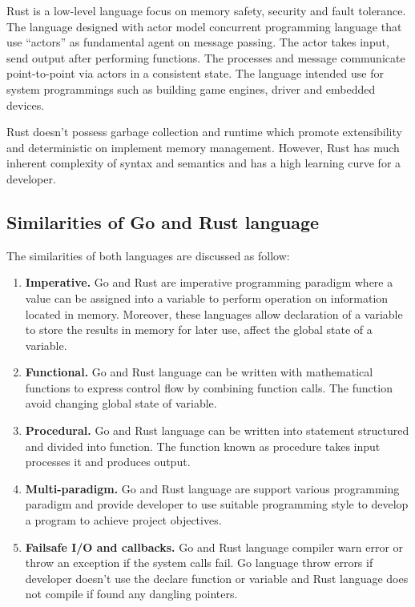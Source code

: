 \pagebreak

Rust is a low-level language focus on memory safety, security and fault tolerance. The language designed with actor model concurrent programming language that use “actors” as fundamental agent on message passing. The actor takes input, send output after performing functions. \cite{rust-actor-model} The processes and message communicate point-to-point via actors in a consistent state. The language intended use for system programmings such as building game engines, driver and embedded devices.

Rust doesn’t possess garbage collection and runtime which promote extensibility and deterministic on implement memory management. \cite{why-use-rust} However, Rust has much inherent complexity of syntax and semantics and has a high learning curve for a developer.
\pagebreak

\subsection{Similarities of Go and Rust language}

The similarities of both languages are discussed as follow: 

\begin{enumerate}[topsep=0pt,itemsep=-1ex,partopsep=1ex,parsep=1.5ex]
	
	\item \textbf{Imperative.} Go and Rust are imperative programming paradigm where a value can be assigned into a variable to perform operation on information located in memory. Moreover, these languages allow declaration of a variable to store the results in memory for later use, affect the global state of a variable.
	\item \textbf{Functional.} Go and Rust language can be written with mathematical functions to express control flow by combining function calls. The function avoid changing global state of variable. 
	\item \textbf{Procedural.} Go and Rust language can be written into statement structured and divided into function. The function known as procedure takes input processes it and produces output.
	\item \textbf{Multi-paradigm.} Go and Rust language are support various programming paradigm and provide developer to use suitable programming style to develop a program to achieve project objectives.
	\item \textbf{Failsafe I/O and callbacks.} Go and Rust language compiler warn error or throw an exception if the system calls fail. Go language throw errors if developer doesn’t use the declare function or variable and Rust language does not compile if found any dangling pointers.
	
\end{enumerate}
\pagebreak

